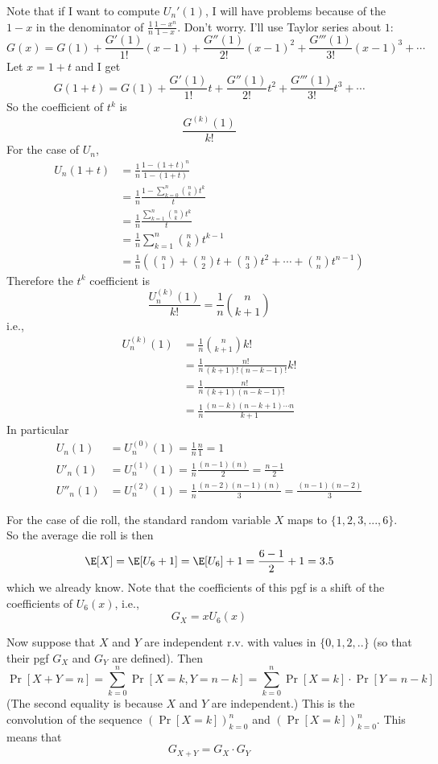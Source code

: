 Note that if I want to compute $U_n'(1)$,
I will have problems because of the $1 - x$ in the
denominator of
$\displaystyle \frac{1}{n} \frac{1 - x^n}{1 - x}$.
Don't worry.
I'll use Taylor series about $1$:
\[
G(x) = G(1) + \frac{G'(1)}{1!} (x-1) + \frac{G''(1)}{2!} (x-1)^2 + \frac{G'''(1)}{3!} (x-1)^3 + \cdots
\]
Let $x = 1 + t$ and I get
\[
G(1 + t) = G(1) + \frac{G'(1)}{1!} t + \frac{G''(1)}{2!} t^2 + \frac{G'''(1)}{3!} t^3 + \cdots
\]
So the coefficient of $t^k$ is
\[
\frac{G^{(k)}(1)}{k!}
\]
For the case of $U_n$,
\begin{align*}
  U_n(1 + t)
  &= \frac{1}{n} \frac{1 - (1 + t)^n}{1 - (1 + t)} \\
  &= \frac{1}{n} \frac{1 - \sum_{k = 0}^n \binom{n}{k}t^k}{t}\\
  &= \frac{1}{n} \frac{\sum_{k = 1}^n \binom{n}{k}t^k}{t}\\
  &= \frac{1}{n} \sum_{k = 1}^n \binom{n}{k}t^{k - 1}\\
  &= \frac{1}{n} \left( \binom{n}{1} + \binom{n}{2} t + \binom{n}{3} t^2 + \cdots + \binom{n}{n} t^{n-1}\right) \tag{*}
\end{align*}
Therefore the $t^k$ coefficient is
\[
\frac{U_n^{(k)}(1)}{k!} = \frac{1}{n} \binom{n}{k + 1}
\]
i.e.,
\begin{align*}
U_n^{(k)}(1)
 &= \frac{1}{n} \binom{n}{k + 1} k! \\
 &= \frac{1}{n} \frac{n!}{(k+1)!(n - k - 1)!} k! \\
 &= \frac{1}{n} \frac{n!}{(k+1)(n - k - 1)!} \\
 &= \frac{1}{n} \frac{(n-k)(n-k+1)\cdots n}{k + 1}
\end{align*}
In particular
\begin{align*}
  U_n(1) &= U_n^{(0)}(1) = \frac{1}{n} \frac{n}{1} = 1 \\
  U'_n(1) &= U_n^{(1)}(1) = \frac{1}{n} \frac{(n - 1)(n)}{2} = \frac{n - 1}{2} \\
  U''_n(1) &= U_n^{(2)}(1) = \frac{1}{n} \frac{(n - 2)(n - 1)(n)}{3} = \frac{(n - 1)(n - 2)}{3}
\end{align*}

For the case of die roll, the standard random variable $X$ maps to $\{1, 2, 3, ..., 6\}$.
So the average die roll is then
\[
\E[X] = \E[U_6 + 1] = \E[U_6] + 1 = \frac{6 - 1}{2} + 1 = 3.5
\]
which we already know.
Note that the coefficients of this pgf is a shift of the
coefficients of $U_6(x)$, i.e.,
\[
G_X = xU_6(x)
\]

Now suppose that $X$ and $Y$ are independent r.v. with values in $\{0, 1, 2, ..\}$ (so that
their pgf $G_X$ and $G_Y$ are defined).
Then
\[
\Pr[X + Y = n] = \sum_{k = 0}^{n} \Pr[X = k, Y = n - k] =  \sum_{k = 0}^{n} \Pr[X = k] \cdot \Pr[Y = n - k]
\]
(The second equality is because $X$ and $Y$ are independent.)
This is the convolution of the sequence $(\Pr[X = k])_{k = 0}^n$ and $(\Pr[X = k])_{k = 0}^n$.
This means that
\[
G_{X + Y} = G_X \cdot G_Y
\]

